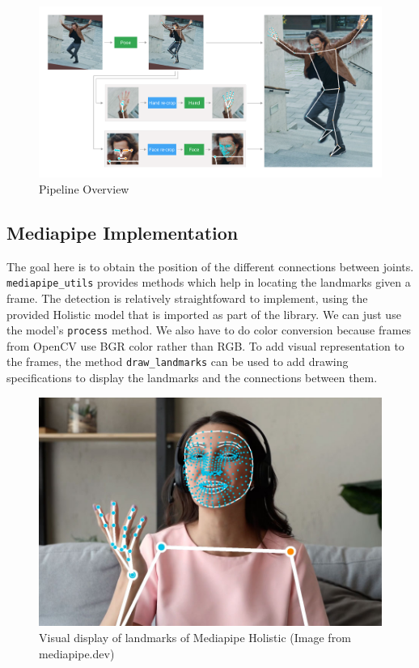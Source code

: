 \documentclass[final,rdr32.tex]{subfiles}
\begin{document}
\begin{figure}[H]
    \begin{center}
        \includegraphics[width=\textwidth]{images/holistic_pipeline.png}
        \caption[caption]{Pipeline Overview}
    \end{center}
\end{figure}

\subsection{Mediapipe Implementation}

The goal here is to obtain the position of the different connections between joints.
\newline \verb|mediapipe_utils| provides methods which help in locating the landmarks given a frame. The detection is relatively straightfoward to implement, using the provided Holistic model that is imported as part of the library. We can just use the model's \verb|process| method. We also have to do color conversion because frames from OpenCV use BGR color rather than RGB. To add visual representation to the frames, the method \verb|draw_landmarks| can be used to add drawing specifications to display the landmarks and the connections between them.

\begin{figure}[H]
    \begin{center}
        \includegraphics[scale=0.3]{images/holistic.jpg}
        \caption[caption]{Visual display of landmarks of Mediapipe Holistic (Image from mediapipe.dev)}
    \end{center}
\end{figure}
\end{document}
